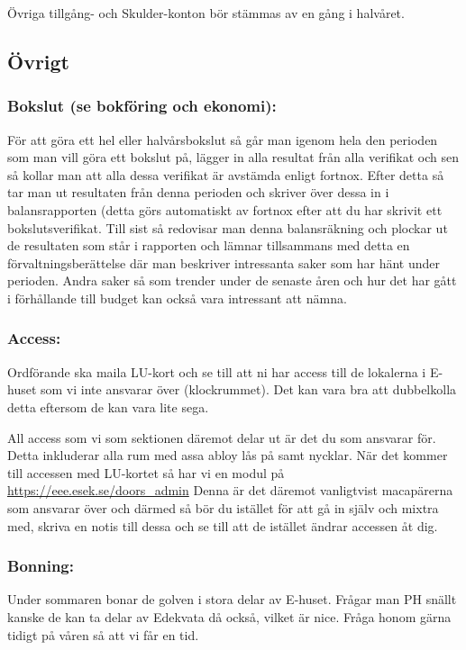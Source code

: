 \documentclass[10pt]{article}
\begin{document}
Övriga tillgång- och Skulder-konton bör stämmas av en gång i halvåret.

\subsection{Övrigt}
\subsubsection{Bokslut (se bokföring och ekonomi):}
För att göra ett hel eller halvårsbokslut så går man igenom hela den perioden som man vill göra ett bokslut på, lägger in alla resultat från alla verifikat och sen så kollar man att alla dessa verifikat är avstämda enligt fortnox. Efter detta så tar man ut resultaten från denna perioden och skriver över dessa in i balansrapporten (detta görs automatiskt av fortnox efter att du har skrivit ett bokslutsverifikat. Till sist så redovisar man denna balansräkning och plockar ut de resultaten som står i rapporten och lämnar tillsammans med detta en förvaltningsberättelse där man beskriver intressanta saker som har hänt under perioden. Andra saker så som trender under de senaste åren och hur det har gått i förhållande till budget kan också vara intressant att nämna.

\subsubsection{Access:}
Ordförande ska maila LU-kort och se till att ni har access till de lokalerna i E-huset som vi inte ansvarar över (klockrummet). Det kan vara bra att dubbelkolla detta eftersom de kan vara lite sega. \newline

All access som vi som sektionen däremot delar ut är det du som ansvarar för. Detta inkluderar alla rum med assa abloy lås på samt nycklar. När det kommer till accessen med LU-kortet så har vi en modul på 
\url{https://eee.esek.se/doors_admin} 
Denna är det däremot vanligtvist macapärerna som ansvarar över och därmed så bör du istället för att gå in själv och mixtra med, skriva en notis till dessa och se till att de istället ändrar accessen åt dig.

\subsubsection{Bonning:}
Under sommaren bonar de golven i stora delar av E-huset. Frågar man PH snällt kanske de kan ta delar av Edekvata då också, vilket är nice. Fråga honom gärna tidigt på våren så att vi får en tid.
\end{document}
